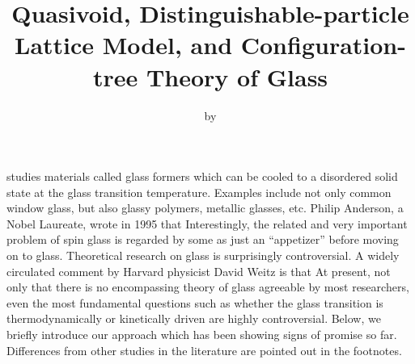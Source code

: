 \documentclass[aps,rmp,tighten,twocolumn,floatfix,a4paper,longbibliography]{revtex4-1}
\begin{document}
\newcommand{\srcfile}[1]{\src{\ssi{src/#1.html}}\srclink{#1}}
\newcommand{\srcfileboth}[1]{\src{\ssi{src/#1.py.html}}\srclink{#1.py} \src{\ssi{src/#1.cpp.html}}\srclink{#1.cpp}}
\newcommand{\datafile}[1]{\link{src/#1}{#1}}

\title{Quasivoid, Distinguishable-particle Lattice Model, and Configuration-tree Theory of Glass}
\author{by }
\maketitle


 studies materials called glass formers which can be cooled to a disordered solid state at the glass transition temperature. Examples include not only common window glass, but also glassy polymers, metallic glasses, etc. Philip Anderson, a Nobel Laureate, wrote in 1995 that 
Interestingly, the related and very important problem of spin glass is regarded by some as just an ``appetizer'' before moving on to glass. Theoretical research on glass is surprisingly controversial.
A widely circulated comment by Harvard physicist David Weitz is that  At present, not only that there is no encompassing theory of glass agreeable by most researchers, even the most fundamental questions such as whether the glass transition is thermodynamically or kinetically driven are highly controversial.
%
Below, we briefly introduce our approach which has been showing signs of promise so far.
Differences from other studies in the literature are pointed out in the footnotes.

\end{document}
